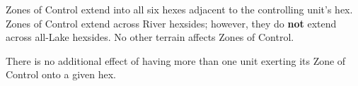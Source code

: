 \subsubsection{} Zones of Control extend into all six hexes adjacent to the controlling unit's hex. Zones of Control extend across River hexsides; however, they do \textbf{not} extend across all-Lake hexsides. No other terrain affects Zones of Control.

There is no additional effect of having more than one unit exerting its Zone of Control onto a given hex.